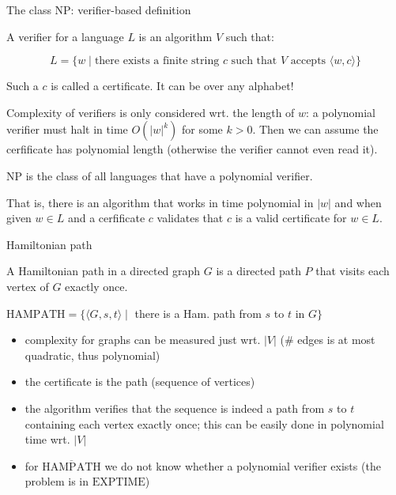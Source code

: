 \documentclass[handout]{beamer}
\begin{document}
    
\begin{frame}{The class NP: verifier-based definition}
    
    \begin{definition}
        A \alert{verifier} for a language $L$ is an algorithm $V$ such that:
        
        \vspace{-24pt}
        $$
        L=\{w\mid \text{there exists a finite string $c$ such that $V$ accepts }\langle w,c\rangle\}
        $$
        \vspace{-24pt}
    \end{definition}
    \vspace{-9pt}
    Such a $c$ is called a \alert{certificate}. It can be over any alphabet!

    Complexity of verifiers is only considered wrt. the length of $w$: a \alert{polynomial verifier} must halt in time $O(|w|^k)$ for some $k>0$. Then we can assume the cerfificate has polynomial length (otherwise the verifier cannot even read it).
    
    \begin{definition}
        \alert{$\mathrm{NP}$} is the class of all languages that have a polynomial verifier.
    \end{definition}
    \vspace{-9pt}
    That is, there is an algorithm that works in time polynomial in $|w|$ and when given $w\in L$ and a cerfificate $c$ validates that $c$ is a valid certificate for $w\in L$.

\end{frame}


\begin{frame}{Hamiltonian path}
    
    A \alert{Hamiltonian path} in a directed graph $G$ is a directed path $P$ that visits each vertex of $G$ exactly once.
    
    $\mathrm{HAMPATH}=\{\langle G,s,t\rangle\mid$ there is a Ham. path from $s$ to $t$ in $G\}$

    \begin{itemize}
        \item complexity for graphs can be measured just wrt. $|V|$ (\# edges is at most quadratic, thus polynomial)
        \item the \alert{certificate} is the path (sequence of vertices)
        \item the algorithm verifies that the sequence is indeed a path from $s$ to $t$ containing each vertex exactly once; this can be easily done in polynomial time wrt. $|V|$
        \item for $\overline{\mathrm{HAMPATH}}$ we do not know whether a polynomial verifier exists (the problem is in $\mathrm{EXPTIME}$)
    \end{itemize}

\end{frame}
\end{document}
